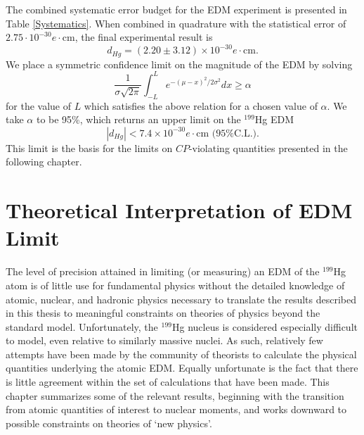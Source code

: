 \documentclass [10pt, twoside] {uwthesis}[2012/04/02]
\begin{document}
The combined systematic error budget for the EDM experiment is presented in Table \ref{Systematics}. When combined in quadrature with the statistical error of $2.75 \cdot 10^{-30} e \cdot \text{cm}$, the final experimental result is
\begin{equation}
d_{Hg} = (2.20 \pm 3.12) \times 10^{-30} e\cdot \text{cm}.
\end{equation}
We place a symmetric confidence limit on the magnitude of the EDM by solving 
\begin{equation}
\dfrac{1}{\sigma\sqrt{2\pi}}\int^L_{-L}e^{-(\mu-x)^2/2\sigma^2}dx\geq \alpha
\end{equation}
for the value of $L$ which satisfies the above relation for a chosen value of $\alpha$. We take $\alpha$ to be 95\%, which returns an upper limit on the $^{199}$Hg EDM
\begin{equation}
|d_{Hg}| < 7.4\times 10^{-30} e\cdot \text{cm} \text{ (95\% C.L.).}
\end{equation}
This limit is the basis for the limits on $CP$-violating quantities presented in the following chapter.

\chapter{Theoretical Interpretation of EDM Limit}	
\label{TheoryChapter}
The level of precision attained in limiting (or measuring) an EDM of the $^{199}$Hg atom is of little use for fundamental physics without the detailed knowledge of atomic, nuclear, and hadronic physics necessary to translate the results described in this thesis to meaningful constraints on theories of physics beyond the standard model. Unfortunately, the $^{199}$Hg nucleus is considered especially difficult to model, even relative to similarly massive nuclei. As such, relatively few attempts have been made by the community of theorists to calculate the physical quantities underlying the atomic EDM. Equally unfortunate is the fact that there is little agreement within the set of calculations that have been made. This chapter summarizes some of the relevant results, beginning with the transition from atomic quantities of interest to nuclear moments, and works downward to possible constraints on theories of `new physics'.
\end{document}
